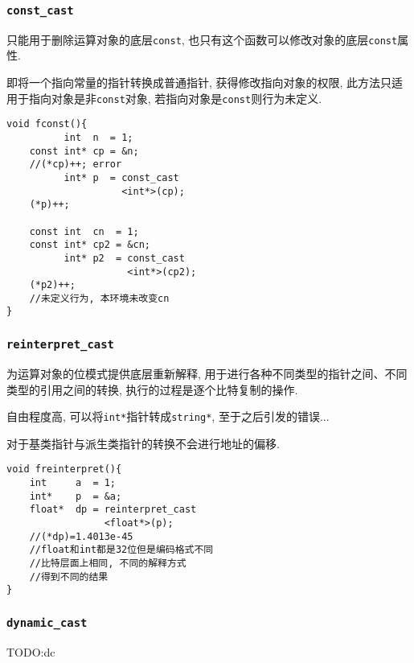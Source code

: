 \subsubsection{\tt{const\_cast}}
\begin{paracol}{2}
	\begin{leftcolumn}
		只能用于删除运算对象的底层{\tt const}, 也只有这个函数可以修改对象的底层{\tt const}属性.

		即将一个指向常量的指针转换成普通指针, 获得修改指向对象的权限, 此方法只适用于指向对象是非{\tt const}对象, 
			若指向对象是{\tt const}则行为未定义.
	\end{leftcolumn}	
	\begin{rightcolumn}
		\begin{lstlisting}[xleftmargin=2em,xrightmargin=2em]
void fconst(){
		  int  n  = 1;
	const int* cp = &n;
	//(*cp)++; error
	      int* p  = const_cast
		  			<int*>(cp);
	(*p)++;

	const int  cn  = 1;
	const int* cp2 = &cn;
		  int* p2  = const_cast
		  			 <int*>(cp2);
	(*p2)++;
	//未定义行为, 本环境未改变cn
}
		\end{lstlisting}
	\end{rightcolumn}
\end{paracol}
\subsubsection{\tt{reinterpret\_cast}}
\begin{paracol}{2}
	\begin{leftcolumn}
		为运算对象的位模式提供底层重新解释, 用于进行各种不同类型的指针之间、不同类型的引用之间的转换, 
			执行的过程是逐个比特复制的操作.

		自由程度高, 可以将{\tt int*}指针转成{\tt string*}, 至于之后引发的错误...

		对于基类指针与派生类指针的转换不会进行地址的偏移. 
	\end{leftcolumn}	
	\begin{rightcolumn}
		\begin{lstlisting}[xleftmargin=2em,xrightmargin=2em]
void freinterpret(){
	int     a  = 1;
	int*    p  = &a;
	float*  dp = reinterpret_cast
				 <float*>(p);
	//(*dp)=1.4013e-45
	//float和int都是32位但是编码格式不同
	//比特层面上相同, 不同的解释方式
	//得到不同的结果
}
		\end{lstlisting}
	\end{rightcolumn}
\end{paracol}
\subsubsection{\tt{dynamic\_cast}}
TODO:dc

